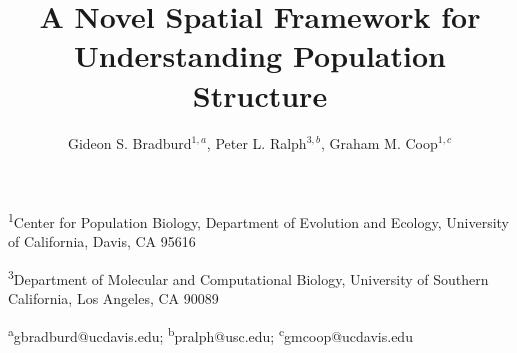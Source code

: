 \documentclass[12pt]{article}
\title{A Novel Spatial Framework for Understanding Population Structure}
\date{\vspace{-5ex}}
\author{Gideon S. Bradburd$^{1,a}$, Peter L. Ralph$^{3,b}$, Graham M. Coop$^{1,c}$}
\begin{document}
\maketitle

\textsuperscript{1}Center for Population Biology, Department of Evolution and Ecology, University of California, Davis, CA 95616

\textsuperscript{3}Department of Molecular and Computational Biology, University of Southern California, Los Angeles, CA 90089

\textsuperscript{a}gbradburd@ucdavis.edu; 
\textsuperscript{b}pralph@usc.edu;
\textsuperscript{c}gmcoop@ucdavis.edu\\\\\

\newpage

\end{document}
